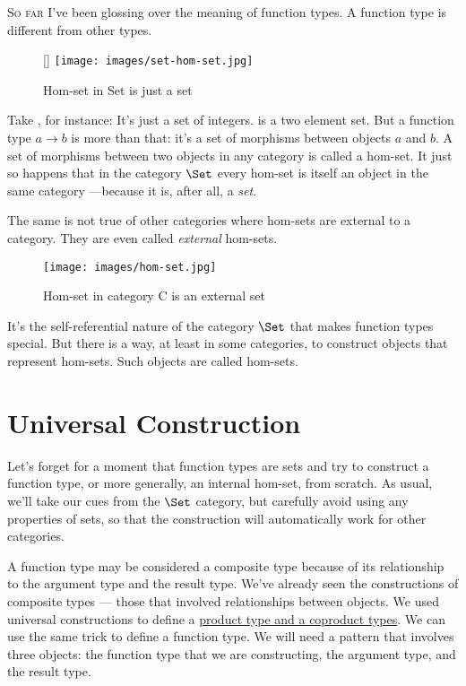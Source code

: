 
\lettrine[lhang=0.17]{S}{o far} I've been glossing over the meaning of function types. A function
type is different from other types.

\begin{wrapfigure}[9]{R}{0pt}
\raisebox{0pt}[\dimexpr{}\baselineskip\relax]{
\texttt{[image: images/set-hom-set.jpg]}}%
\caption{Hom-set in Set is just a set}
\end{wrapfigure}

Take , for instance: It's just a set of integers.
 is a two element set. But a function type
$a\to b$ is more than that: it's a set of morphisms
between objects $a$ and $b$. A set of morphisms between
two objects in any category is called a hom-set. It just so happens that
in the category $\Set$ every hom-set is itself an object in the
same category ---because it is, after all, a \emph{set}.

The same is not true of other categories where hom-sets are external to
a category. They are even called \emph{external} hom-sets.

\begin{figure}[h]
  \centering
  \texttt{[image: images/hom-set.jpg]}
  \caption{Hom-set in category C is an external set}
\end{figure}

It's the self-referential nature of the category $\Set$ that makes
function types special. But there is a way, at least in some categories,
to construct objects that represent hom-sets. Such objects are called
 hom-sets.

\section{Universal Construction}

Let's forget for a moment that function types are sets and try to
construct a function type, or more generally, an internal hom-set, from
scratch. As usual, we'll take our cues from the $\Set$ category,
but carefully avoid using any properties of sets, so that the
construction will automatically work for other categories.

A function type may be considered a composite type because of its
relationship to the argument type and the result type. We've already
seen the constructions of composite types --- those that involved
relationships between objects. We used universal constructions to define
a \hyperref[products-and-coproducts]{product
type and a coproduct types}. We can use the same trick to define a
function type. We will need a pattern that involves three objects: the
function type that we are constructing, the argument type, and the
result type.

